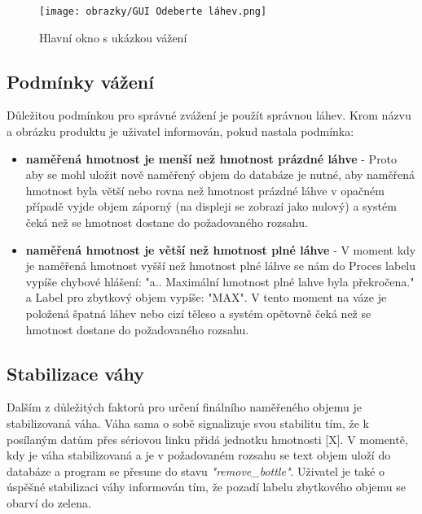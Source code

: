 \begin{figure}[H]
    \begin{center}
        \texttt{[image: obrazky/GUI Odeberte láhev.png]}
    \end{center}
    \caption{Hlavní okno s ukázkou vážení}
    \label{Hlavní okno s ukázkou vážení}
\end{figure}

\subsection{Podmínky vážení}
Důležitou podmínkou pro správné zvážení je použít správnou láhev. Krom názvu a obrázku produktu je uživatel informován, pokud nastala podmínka:
\begin{itemize}
    \item \textbf{naměřená hmotnost je menší než hmotnost prázdné láhve} - Proto aby se mohl uložit nově naměřený objem do databáze je nutné, aby naměřená hmotnost byla větší nebo rovna než hmotnost prázdné láhve v opačném případě vyjde objem záporný (na displeji se zobrazí jako nulový) a systém čeká než se hmotnost dostane do požadovaného rozsahu.
    \item \textbf{naměřená hmotnost je větší než hmotnost plné láhve} - V moment kdy je naměřená hmotnost vyšší než hmotnost plné láhve se nám do Proces labelu vypíše chybové hlášení: "a.. Maximální hmotnost plné lahve byla překročena." a Label pro zbytkový objem vypíše: "MAX". V tento moment na váze je položená špatná láhev nebo cizí těleso a systém opětovně čeká než se hmotnost dostane do požadovaného rozsahu.
\end{itemize}

\subsection{Stabilizace váhy}
Dalším z důležitých faktorů pro určení finálního naměřeného objemu je stabilizovaná váha. Váha sama o sobě signalizuje svou stabilitu tím, že k posílaným datům přes sériovou linku přidá jednotku hmotnosti [X]. V momentě, kdy je váha stabilizovaná a je v požadovaném rozsahu se text objem uloží do databáze a program se přesune do stavu \textit{"remove\_bottle"}. Uživatel je také o úspěšné stabilizaci váhy informován tím, že pozadí labelu zbytkového objemu se obarví do zelena. 

